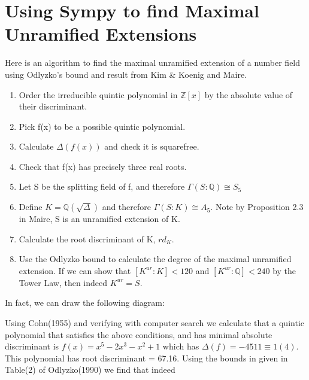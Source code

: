 \documentclass[preprint,12pt,reqno]{elsarticle}
\begin{document}
\section{Using Sympy to find Maximal Unramified Extensions}
Here is an algorithm to find the maximal unramified extension of a number field using Odlyzko's bound and result from Kim \& Koenig and Maire.
\begin{enumerate}
  \item  Order the irreducible quintic polynomial in $\mathbb{Z}[x]$ by the absolute value of their discriminant. 
  \item Pick f(x) to be a possible quintic polynomial.
  \item Calculate $\Delta(f(x))$ and check it is squarefree.
  \item Check that f(x) has precisely three real roots. 
  \item Let S be the splitting field of f, and therefore $\Gamma(S:\mathbb{Q})\cong S_5$
  \item Define $K=\mathbb{Q}(\sqrt{\Delta})$ and therefore $\Gamma(S:K)\cong A_5$. Note by Proposition 2.3 in Maire, S is an unramified extension of K. 
  \item Calculate the root discriminant of K, $rd_K$.
  \item Use the Odlyzko bound to calculate the degree of the maximal unramified extension. If we can show that $[K^{ur}:K]<120$ and $[K^{ur}:\mathbb{Q}]<240$ by the Tower Law, then indeed $K^{ur} = S$.
\end{enumerate}
\newline
In fact, we can draw the following diagram: 
\newline
\begin{center}
\end{center}
Using Cohn(1955) and verifying with computer search we calculate that a quintic polynomial that satisfies the above conditions, and has minimal absolute discriminant is $f(x) = x^5-2x^3-x^2+1$ which has $\Delta(f) = -4511\equiv1(4)$.
This polynomial has root discriminant = 67.16.
Using the bounds in given in Table(2) of Odlyzko(1990) we find that indeed
\end{document}
